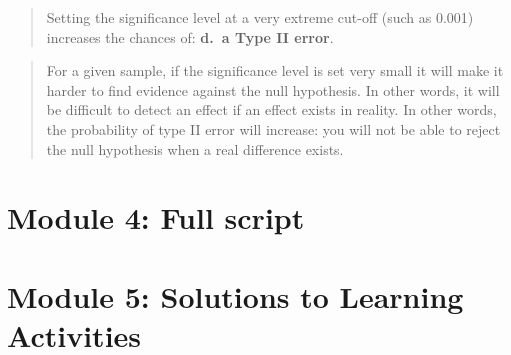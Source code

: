 \documentclass[
]{memoir}
\newenvironment{Shaded}{\begin{snugshade}}{\end{snugshade}}
\newcommand{\AttributeTok}[1]{\textcolor[rgb]{0.77,0.63,0.00}{#1}}
\newcommand{\CommentTok}[1]{\textcolor[rgb]{0.56,0.35,0.01}{\textit{#1}}}
\newcommand{\DecValTok}[1]{\textcolor[rgb]{0.00,0.00,0.81}{#1}}
\newcommand{\FunctionTok}[1]{\textcolor[rgb]{0.00,0.00,0.00}{#1}}
\newcommand{\NormalTok}[1]{#1}
\newcommand{\OtherTok}[1]{\textcolor[rgb]{0.56,0.35,0.01}{#1}}
\newcommand{\SpecialCharTok}[1]{\textcolor[rgb]{0.00,0.00,0.00}{#1}}
\newcommand{\StringTok}[1]{\textcolor[rgb]{0.31,0.60,0.02}{#1}}
\begin{document}
\begin{quote}
Setting the significance level at a very extreme cut-off (such as 0.001) increases the chances of: \textbf{d.~a Type II error}.
\end{quote}

\begin{quote}
For a given sample, if the significance level is set very small it will make it harder to find evidence against the null hypothesis. In other words, it will be difficult to detect an effect if an effect exists in reality. In other words, the probability of type II error will increase: you will not be able to reject the null hypothesis when a real difference exists.
\end{quote}

\hypertarget{module-4-full-script}{%
\chapter*{Module 4: Full script}\label{module-4-full-script}}

\begin{Shaded}
\end{Shaded}

\hypertarget{module-5-solutions-to-learning-activities}{%
\chapter*{Module 5: Solutions to Learning Activities}\label{module-5-solutions-to-learning-activities}}
\end{document}

